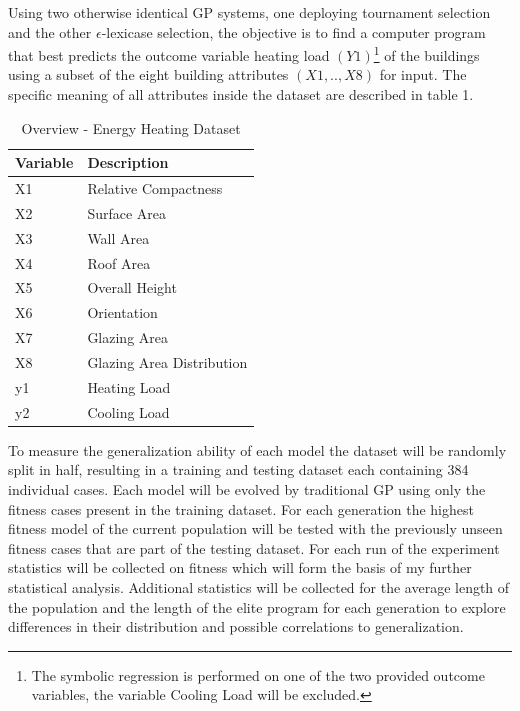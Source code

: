\documentclass[
  12pt,
]{article}
\begin{document}
Using two otherwise identical GP systems, one deploying tournament
selection and the other \(\epsilon\)-lexicase selection, the objective
is to find a computer program that best predicts the outcome variable
heating load \((Y1)\)\footnote{The symbolic regression is performed on
  one of the two provided outcome variables, the variable Cooling Load
  will be excluded.} of the buildings using a subset of the eight
building attributes \((X1,..,X8)\) for input. The specific meaning of
all attributes inside the dataset are described in table 1.

\begin{table}[!h]

\caption{\label{tab:unnamed-chunk-1}Overview - Energy Heating Dataset}
\centering
\begin{tabular}[t]{l|l}
\hline
\textbf{Variable} & \textbf{Description}\\
\hline
X1 & Relative Compactness\\
\hline
X2 & Surface Area\\
\hline
X3 & Wall Area\\
\hline
X4 & Roof Area\\
\hline
X5 & Overall Height\\
\hline
X6 & Orientation\\
\hline
X7 & Glazing Area\\
\hline
X8 & Glazing Area Distribution\\
\hline
y1 & Heating Load\\
\hline
y2 & Cooling Load\\
\hline
\end{tabular}
\end{table}

To measure the generalization ability of each model the dataset will be
randomly split in half, resulting in a training and testing dataset each
containing 384 individual cases. Each model will be evolved by
traditional GP using only the fitness cases present in the training
dataset. For each generation the highest fitness model of the current
population will be tested with the previously unseen fitness cases that
are part of the testing dataset. For each run of the experiment
statistics will be collected on fitness which will form the basis of my
further statistical analysis. Additional statistics will be collected
for the average length of the population and the length of the elite
program for each generation to explore differences in their distribution
and possible correlations to generalization.
\end{document}
